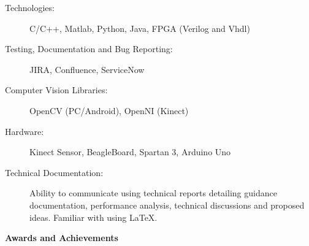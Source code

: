 \documentclass[letterpaper,11pt]{article}
\newcommand{\resitem}[1]{\item #1 \vspace{-2pt}}
\newcommand{\resheading}[1]{{\large \colorbox{mygrey}{\begin{minipage}{\textwidth}{\textbf{#1 \vphantom{p\^{E}}}}\end{minipage}}}}
\begin{document}
	\begin{description}
		\item[Technologies:] { \footnotesize C/C++, Matlab, Python, Java, FPGA (Verilog and Vhdl)}				\item[Testing, Documentation and Bug Reporting:]{\footnotesize JIRA, Confluence, ServiceNow}
		\item[Computer Vision Libraries:]{ \footnotesize OpenCV (PC/Android), OpenNI (Kinect)}	
		\item[Hardware:]{\footnotesize Kinect Sensor, BeagleBoard, Spartan 3, Arduino Uno} 
\item[Technical Documentation:] Ability to communicate using technical reports detailing guidance documentation, performance analysis, technical discussions and proposed ideas. Familiar with using \LaTeX.
		
	\end{description}
	\resheading{Awards and Achievements}
\end{document}
